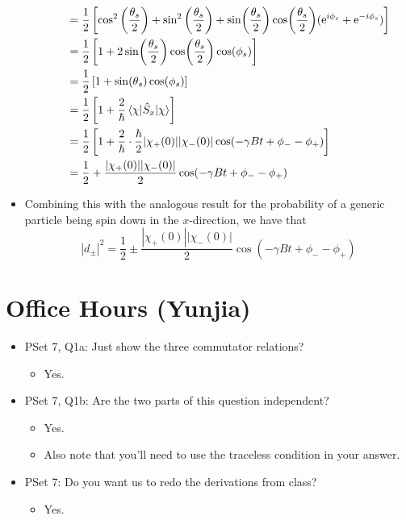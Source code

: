 \documentclass[../notes.tex]{subfiles}
\begin{document}
\begin{itemize}
\begin{itemize}
\begin{align*}
            &= \frac{1}{2}\left[ \cos^2\left( \frac{\theta_s}{2} \right)+\sin^2\left( \frac{\theta_s}{2} \right)+\sin(\frac{\theta_s}{2})\cos(\frac{\theta_s}{2})(\e[i\phi_s]+\e[-i\phi_s]) \right]\\
            &= \frac{1}{2}\left[ 1+2\sin(\frac{\theta_s}{2})\cos(\frac{\theta_s}{2})\cos(\phi_s) \right]\\
            &= \frac{1}{2}\left[ 1+\sin(\theta_s)\cos(\phi_s) \right]\\
            &= \frac{1}{2}\left[ 1+\frac{2}{\hbar}\ev{\hat{S}_x}{\chi} \right]\\
            &= \frac{1}{2}\left[ 1+\frac{2}{\hbar}\cdot\frac{\hbar}{2}|\chi_+(0)||\chi_-(0)|\cos(-\gamma Bt+\phi_--\phi_+) \right]\\
            &= \frac{1}{2}+\frac{|\chi_+(0)||\chi_-(0)|}{2}\cos(-\gamma Bt+\phi_--\phi_+)
        \end{align*}
    \end{itemize}
    \item Combining this with the analogous result for the probability of a generic particle being spin down in the $x$-direction, we have that
    \begin{equation*}
        |d_\pm|^2 = \frac{1}{2}\pm\frac{|\chi_+(0)||\chi_-(0)|}{2}\cos(-\gamma Bt+\phi_--\phi_+)
    \end{equation*}
\end{itemize}



\section{Office Hours (Yunjia)}
\begin{itemize}
    \item {}PSet 7, Q1a: Just show the three commutator relations?
    \begin{itemize}
        \item Yes.
    \end{itemize}
    \item PSet 7, Q1b: Are the two parts of this question independent?
    \begin{itemize}
        \item Yes.
        \item Also note that you'll need to use the traceless condition in your answer.
    \end{itemize}
    \item PSet 7: Do you want us to redo the derivations from class?
    \begin{itemize}
        \item Yes.
    \end{itemize}
\end{itemize}
\end{document}
